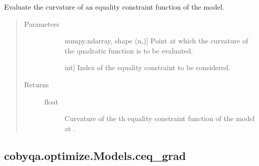 \documentclass[letterpaper,10pt,english]{sphinxmanual}
\begin{document}
\begin{fulllineitems}
\begin{fulllineitems}
\label{\detokenize{refs/generated/cobyqa.optimize.Models.ceq_curv:cobyqa.optimize.Models.ceq_curv}}
\sphinxAtStartPar
Evaluate the curvature of an equality constraint function of the model.
\begin{quote}\begin{description}
\item[{Parameters}] \leavevmode\begin{description}
\item[{}] \leavevmode{[}numpy.ndarray, shape (n,){]}
\sphinxAtStartPar
Point at which the curvature of the quadratic function is to be
evaluated.

\item[{}] \leavevmode{[}int{]}
\sphinxAtStartPar
Index of the equality constraint to be considered.

\end{description}

\item[{Returns}] \leavevmode\begin{description}
\item[{float}] \leavevmode
\sphinxAtStartPar
Curvature of the \sphinxhyphen{}th equality constraint function of the model at
.

\end{description}

\end{description}\end{quote}

\end{fulllineitems}



\subsection{cobyqa.optimize.Models.ceq\_grad}
\label{\detokenize{refs/generated/cobyqa.optimize.Models.ceq_grad:cobyqa-optimize-models-ceq-grad}}\label{\detokenize{refs/generated/cobyqa.optimize.Models.ceq_grad::doc}}


\end{fulllineitems}
\end{document}
